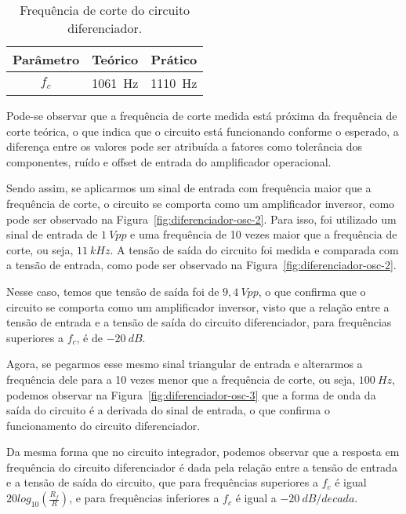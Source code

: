 \begin{table}[H]
    \centering
    \caption{Frequência de corte do circuito diferenciador.}
    \label{tab:resultados-diferenciador}
    \begin{tabular}{|c|c|c|}
        \hline
        \textbf{Parâmetro} & \textbf{Teórico} & \textbf{Prático} \\ \hline
        $f_c$             & 1061~Hz         & 1110~Hz          \\ \hline
    \end{tabular}
\end{table}

Pode-se observar que a frequência de corte medida está próxima da frequência de corte teórica, o que indica que o circuito está funcionando conforme o esperado, a diferença entre os valores pode ser atribuída a fatores como tolerância dos componentes, ruído e offset de entrada do amplificador operacional.

Sendo assim, se aplicarmos um sinal de entrada com frequência maior que a frequência de corte, o circuito se comporta como um amplificador inversor, como pode ser observado na Figura~\ref{fig:diferenciador-osc-2}. Para isso, foi utilizado um sinal de entrada de $1~Vpp$ e uma frequência de 10 vezes maior que a frequência de corte, ou seja, $11~kHz$. A tensão de saída do circuito foi medida e comparada com a tensão de entrada, como pode ser observado na Figura~\ref{fig:diferenciador-osc-2}.


Nesse caso, temos que tensão de saída foi de $9,4~Vpp$, o que confirma que o circuito se comporta como um amplificador inversor, visto que a relação entre a tensão de entrada e a tensão de saída do circuito diferenciador, para frequências superiores a $f_c$, é de $-20~dB$. 

Agora, se pegarmos esse mesmo sinal triangular de entrada e alterarmos a frequência dele para a 10 vezes menor que a frequência de corte, ou seja, $100~Hz$, podemos observar na Figura~\ref{fig:diferenciador-osc-3} que a forma de onda da saída do circuito é a derivada do sinal de entrada, o que confirma o funcionamento do circuito diferenciador. 


Da mesma forma que no circuito integrador, podemos observar que a resposta em frequência do circuito diferenciador é dada pela relação entre a tensão de entrada e a tensão de saída do circuito, que para frequências superiores a $f_c$ é igual $20log_{10}(\frac{R_f}{R})$, e para frequências inferiores a $f_c$ é igual a $-20~dB/decada$.